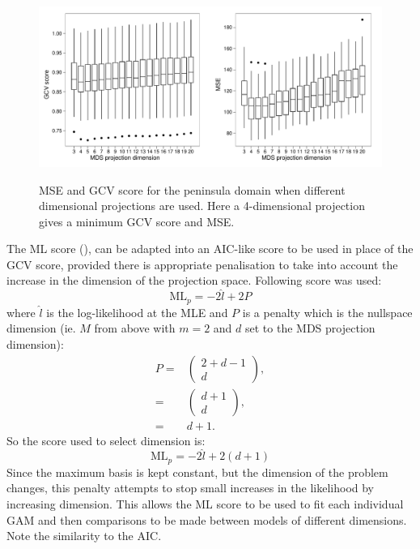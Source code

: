 \begin{figure}
\centering
\includegraphics[width=6in]{mds/figs/wt2-gcv-projdim-boxplot.pdf} \\
\caption{MSE and GCV score for the peninsula domain when different dimensional projections are used. Here a 4-dimensional projection gives a minimum GCV score and MSE.}
\label{wt2-gcv-projdim-boxplot}
\end{figure}

The ML score (\cite{remlpaper}), can be adapted into an AIC-like score to be used in place of the GCV score, provided there is appropriate penalisation to take into account the increase in the dimension of the projection space. Following score was used:
\begin{equation*}
\text{ML}_p = -2 \hat{l} + 2P
\end{equation*}
where $\hat{l}$ is the log-likelihood at the MLE and $P$ is a penalty which is the nullspace dimension (ie. $M$ from above with $m=2$ and $d$ set to the MDS projection dimension):
\begin{align*}
P =& \begin{pmatrix} 2+d-1 \\ d  \end{pmatrix},\\
=& \begin{pmatrix} d+1 \\ d  \end{pmatrix},\\
=& d+1.
\end{align*}
So the score used to select dimension is:
\begin{equation*}
\text{ML}_p = -2 \hat{l} + 2(d+1)
\end{equation*}
Since the maximum basis is kept constant, but the dimension of the problem changes, this penalty attempts to stop small increases in the likelihood by increasing dimension. This allows the ML score to be used to fit each individual GAM and then comparisons to be made between models of different dimensions. Note the similarity to the AIC.

